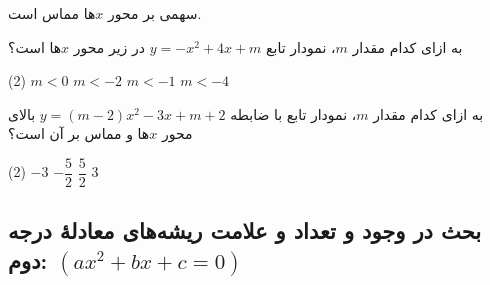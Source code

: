 \begin{remark}
\begin{enumerate}
\begin{minipage}[c]{0.43\linewidth}
        \end{minipage}
        \hfill
        \begin{minipage}[c]{0.43\linewidth}
            سهمی بر محور \(x\)ها مماس است.
        \end{minipage}
    \end{enumerate}
\end{remark}


\begin{example}
    به ازای کدام مقدار \(m\)، نمودار تابع
    $y=-x^2+4x+m$
    در زیر محور \(x\)ها است؟

    \begin{tasks}(2)
        \task \(m<0\)
        \task \(m<-2\)
        \task \(m<-1\)
        \task \(m<-4\)
    \end{tasks}
\end{example}


\begin{example}
    به ازای کدام مقدار \(m\)، نمودار تابع با ضابطه
    $y=(m-2)x^2-3x+m+2$
    بالای محور \(x\)ها و مماس بر آن است؟

    \begin{tasks}(2)
        \task \(-3\)
        \task \(-\dfrac{5}{2}\)
        \task \(\dfrac{5}{2}\)
        \task \(3\)
    \end{tasks}
\end{example}



\subsection{بحث در وجود و تعداد و علامت ریشه‌های معادلۀ درجه دوم:
\hfill
$(ax^2+bx+c=0)$
}


